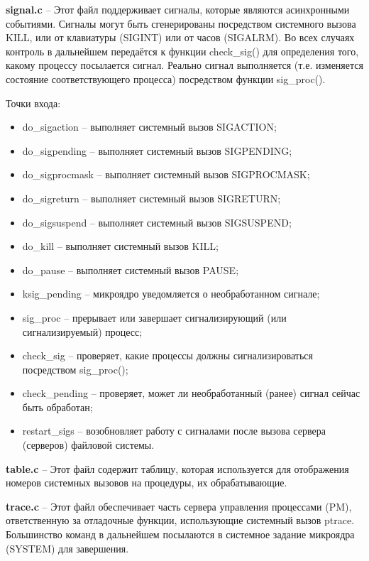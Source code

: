 \textbf{signal.c} -- Этот файл поддерживает сигналы, которые являются асинхронными событиями. Сигналы могут быть сгенерированы посредством системного вызова KILL, или от клавиатуры (SIGINT) или от часов (SIGALRM). Во всех случаях контроль в дальнейшем передаётся к функции check\_sig() для определения того, какому процессу посылается сигнал. Реально сигнал выполняется (т.е. изменяется состояние соответствующего процесса) посредством функции sig\_proc().

Точки входа:
\begin{itemize}
\item do\_sigaction -- выполняет системный вызов SIGACTION;
\item do\_sigpending -- выполняет системный вызов SIGPENDING;
\item do\_sigprocmask -- выполняет системный вызов SIGPROCMASK;
\item do\_sigreturn -- выполняет системный вызов SIGRETURN;
\item do\_sigsuspend -- выполняет системный вызов SIGSUSPEND;
\item do\_kill -- выполняет системный вызов KILL;
\item do\_pause -- выполняет системный вызов PAUSE;
\item ksig\_pending -- микроядро уведомляется о необработанном сигнале;
\item sig\_proc -- прерывает или завершает сигнализирующий (или сигнализируемый) процесс;
\item check\_sig -- проверяет, какие процессы должны сигнализироваться посредством sig\_proc();
\item check\_pending -- проверяет, может ли необработанный (ранее) сигнал сейчас быть обработан;
\item restart\_sigs -- возобновляет работу с сигналами после вызова сервера (серверов) файловой системы.
\end{itemize}

\textbf{table.c} -- Этот файл содержит таблицу, которая используется для отображения номеров системных вызовов на процедуры, их обрабатывающие.

\textbf{trace.c} -- Этот файл обеспечивает часть сервера управления процессами (PM), ответственную за отладочные функции, использующие системный вызов ptrace. Большинство команд в дальнейшем посылаются в системное задание микроядра (SYSTEM) для завершения.

